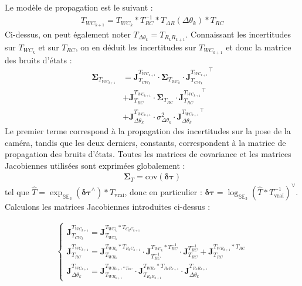 \documentclass[a4paper]{article}
\begin{document}
Le modèle de propagation est le suivant :
\begin{align}
T_{WC_{k+1}} = T_{WC_k} \ast T_{RC}^{-1} \ast T_{\Delta{R}}(\Delta\theta_k) \ast T_{RC}
\end{align}
Ci-dessus, on peut également noter $T_{\Delta\theta_k} = T_{R_kR_{k+1}}$.
Connaissant les incertitudes sur $T_{WC_k}$ et sur $T_{RC}$, on en déduit les incertitudes sur 
$T_{WC_{k+1}}$ et donc la matrice des bruits d'états :
\begin{subequations}
\begin{align}
\bm{\Sigma}_{T_{WC_{k+1}}} &=
\bm{J}^{T_{WC_{k+1}}}_{T_{CW_k}} \cdot \bm{\Sigma}_{T_{WC_{k}}} \cdot 
{\bm{J}^{T_{WC_{k+1}}}_{T_{CW_k}}}^{\top}\\
&+
\bm{J}^{T_{WC_{k+1}}}_{T_{RC}} \cdot \bm{\Sigma}_{T_{RC}} \cdot 
{\bm{J}^{T_{WC_{k+1}}}_{T_{RC}}}^{\top}\\
&+
\bm{J}^{T_{WC_{k+1}}}_{\Delta\theta_k} \cdot \sigma_{\Delta\theta_k}^2 \cdot 
{\bm{J}^{T_{WC_{k+1}}}_{\Delta\theta_k}}^{\top}
\end{align}
\end{subequations}
Le premier terme correspond à la propagation des incertitudes sur la pose de la caméra, tandis 
que les deux derniers, constants, correspondent à la matrice de propagation des bruits d'états.
Toutes les matrices de covariance et les matrices Jacobiennes utilisées sont exprimées 
globalement :
\begin{align}
\bm{\Sigma}_{T} = \text{cov}(\bm{\delta\tau})
\end{align}
tel que $\hat{T} = \exp_{\mathbb{SE}_3}(\bm{\delta\tau}^{\wedge}) \ast T_{\text{vrai}}$, donc en 
particulier : $\bm{\delta\tau} = \log_{\mathbb{SE}_3}(\hat{T} \ast T_{\text{vrai}}^{-1})^{\vee}$.
Calculons les matrices Jacobiennes introduites ci-dessus :

\begin{align}
\left\{\begin{array}{l}
%
\bm{J}^{T_{WC_{k+1}}}_{T_{CW_k}} =
\bm{J}^{T_{WC_{k}} \ast T_{C_kC_{k+1}}}_{T_{WC_k}}\\[1em]
%
\bm{J}^{T_{WC_{k+1}}}_{T_{RC}} =
\bm{J}^{T_{WR_k} \ast T_{R_kC_{k+1}}}_{T_{WR_k}} \cdot \bm{J}^{T_{WC_k} \ast T_{RC}^{-1}}_{T_{RC}^{-1}} \cdot 
\bm{J}^{T_{RC}^{-1}}_{T_{RC}}
+ \bm{J}^{T_{WR_{k+1}} \ast T_{RC}}_{T_{RC}}\\[1em]
%
\bm{J}^{T_{WC_{k+1}}}_{\Delta\theta_k} =
\bm{J}^{T_{WR_{k+1} \ast T_{RC}}}_{T_{WR_{k+1}}} \cdot
\bm{J}^{T_{WR_k} \ast T_{R_kR_{k+1}}}_{T_{R_kR_{k+1}}} \cdot
\bm{J}^{T_{R_kR_{k+1}}}_{\Delta\theta_k}
\end{array}\right.
\end{align}
\end{document}
